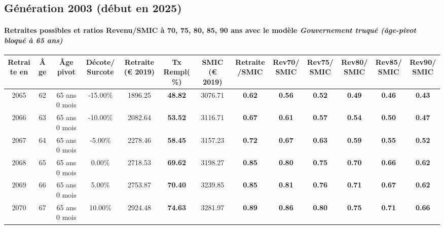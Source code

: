 \newpage 
 
\subsection{Génération 2003 (début en 2025)} 

\paragraph{Retraites possibles et ratios Revenu/SMIC à 70, 75, 80, 85, 90 ans avec le modèle \emph{Gouvernement truqué (âge-pivot bloqué à 65 ans)}}  
 
{ \scriptsize \begin{center} 
\begin{tabular}[htb]{|c|c||c|c||c|c||c||c|c|c|c|c|c|} 
\hline 
 Retraite en &  Âge &  Âge pivot &  Décote/Surcote &  Retraite (\euro{} 2019) &  Tx Rempl(\%) &  SMIC (\euro{} 2019) &  Retraite/SMIC &  Rev70/SMIC &  Rev75/SMIC &  Rev80/SMIC &  Rev85/SMIC &  Rev90/SMIC \\ 
\hline \hline 
 2065 &  62 &  65 ans 0 mois &  -15.00\% &  1896.25 &  {\bf 48.82} &  3076.71 &  {\bf {\color{red} 0.62}} &  {\bf {\color{red} 0.56}} &  {\bf {\color{red} 0.52}} &  {\bf {\color{red} 0.49}} &  {\bf {\color{red} 0.46}} &  {\bf {\color{red} 0.43}} \\ 
\hline 
 2066 &  63 &  65 ans 0 mois &  -10.00\% &  2082.64 &  {\bf 53.52} &  3116.71 &  {\bf {\color{red} 0.67}} &  {\bf {\color{red} 0.61}} &  {\bf {\color{red} 0.57}} &  {\bf {\color{red} 0.54}} &  {\bf {\color{red} 0.50}} &  {\bf {\color{red} 0.47}} \\ 
\hline 
 2067 &  64 &  65 ans 0 mois &  -5.00\% &  2278.46 &  {\bf 58.45} &  3157.23 &  {\bf {\color{red} 0.72}} &  {\bf {\color{red} 0.67}} &  {\bf {\color{red} 0.63}} &  {\bf {\color{red} 0.59}} &  {\bf {\color{red} 0.55}} &  {\bf {\color{red} 0.52}} \\ 
\hline 
 2068 &  65 &  65 ans 0 mois &  0.00\% &  2718.53 &  {\bf 69.62} &  3198.27 &  {\bf {\color{red} 0.85}} &  {\bf {\color{red} 0.80}} &  {\bf {\color{red} 0.75}} &  {\bf {\color{red} 0.70}} &  {\bf {\color{red} 0.66}} &  {\bf {\color{red} 0.62}} \\ 
\hline 
 2069 &  66 &  65 ans 0 mois &  5.00\% &  2753.87 &  {\bf 70.40} &  3239.85 &  {\bf {\color{red} 0.85}} &  {\bf {\color{red} 0.81}} &  {\bf {\color{red} 0.76}} &  {\bf {\color{red} 0.71}} &  {\bf {\color{red} 0.67}} &  {\bf {\color{red} 0.62}} \\ 
\hline 
 2070 &  67 &  65 ans 0 mois &  10.00\% &  2924.48 &  {\bf 74.63} &  3281.97 &  {\bf {\color{red} 0.89}} &  {\bf {\color{red} 0.86}} &  {\bf {\color{red} 0.80}} &  {\bf {\color{red} 0.75}} &  {\bf {\color{red} 0.71}} &  {\bf {\color{red} 0.66}} \\ 
\hline 
\hline 
\end{tabular} 
\end{center} } 
